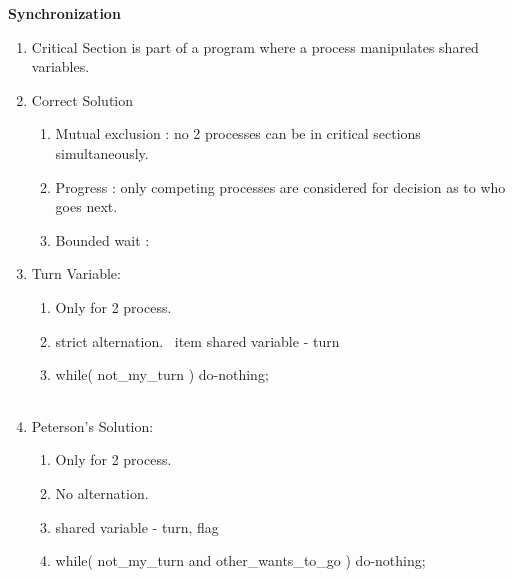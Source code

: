 
\centerline{\textbf{ \LARGE Synchronization}}




\begin{enumerate}

  \item Critical Section is part of a program where a process manipulates shared variables.
  \item Correct Solution
  \begin{enumerate}
    \item Mutual exclusion : no 2 processes can be in critical sections simultaneously.
    \item Progress : only competing processes are considered for decision as to who goes next.
    \item Bounded wait :
  \end{enumerate}


  \item Turn Variable:
  \begin{enumerate}
    \item Only for 2 process.
    \item strict alternation.
    \ item shared variable - turn
    \item while( not\_my\_turn ) do-nothing;
  \end{enumerate}
      \begin{myTableStyle}
        \begin{tabular}{ |m{5cm}|m{5cm}| } \hline
               &        \\ \hline
        \end{tabular}
      \end{myTableStyle}
      \vspace{0.08in}

  \item Peterson's Solution:
  \begin{enumerate}
    \item Only for 2 process.
    \item No alternation.
    \item shared variable - turn, flag
    \item while( not\_my\_turn and other\_wants\_to\_go ) do-nothing;
  \end{enumerate}
      \begin{myTableStyle}
        \begin{tabular}{ |m{6cm}|m{6cm}| } \hline
               &      \\ \hline
        \end{tabular}
      \end{myTableStyle}
      \vspace{0.08in}


\end{enumerate}
